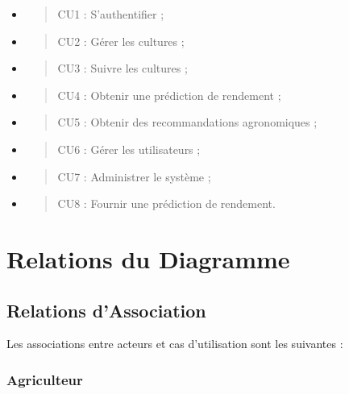 \begin{itemize}
\item
  \begin{quote}
  CU1 : S'authentifier ;
  \end{quote}
\item
  \begin{quote}
  CU2 : Gérer les cultures ;
  \end{quote}
\item
  \begin{quote}
  CU3 : Suivre les cultures ;
  \end{quote}
\item
  \begin{quote}
  CU4 : Obtenir une prédiction de rendement ;
  \end{quote}
\item
  \begin{quote}
  CU5 : Obtenir des recommandations agronomiques ;
  \end{quote}
\item
  \begin{quote}
  CU6 : Gérer les utilisateurs ;
  \end{quote}
\item
  \begin{quote}
  CU7 : Administrer le système ;
  \end{quote}
\item
  \begin{quote}
  CU8 : Fournir une prédiction de rendement.
  \end{quote}
\end{itemize}

\hypertarget{relations-du-diagramme}{%
\section{Relations du Diagramme}\label{relations-du-diagramme}}

\hypertarget{relations-dassociation}{%
\subsection{Relations d'Association}\label{relations-dassociation}}

Les associations entre acteurs et cas d'utilisation sont les suivantes :

\hypertarget{agriculteur-1}{%
\subsubsection{Agriculteur}\label{agriculteur-1}}

